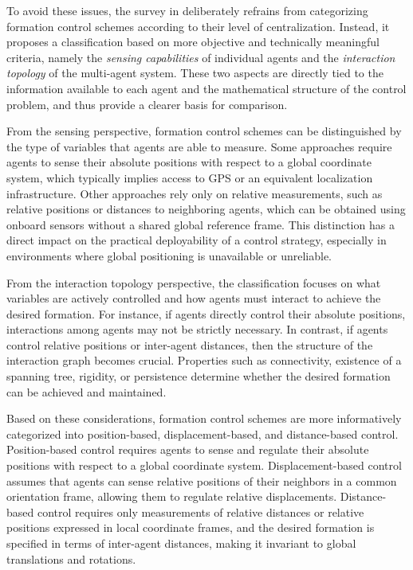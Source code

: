 To avoid these issues, the survey in \cite{Oh2015} deliberately refrains from categorizing formation control schemes according to their level of centralization. Instead, it proposes a classification based on more objective and technically meaningful criteria, namely the \emph{sensing capabilities} of individual agents and the \emph{interaction topology} of the multi-agent system. These two aspects are directly tied to the information available to each agent and the mathematical structure of the control problem, and thus provide a clearer basis for comparison.

From the sensing perspective, formation control schemes can be distinguished by the type of variables that agents are able to measure. Some approaches require agents to sense their absolute positions with respect to a global coordinate system, which typically implies access to GPS or an equivalent localization infrastructure. Other approaches rely only on relative measurements, such as relative positions or distances to neighboring agents, which can be obtained using onboard sensors without a shared global reference frame. This distinction has a direct impact on the practical deployability of a control strategy, especially in environments where global positioning is unavailable or unreliable.

From the interaction topology perspective, the classification focuses on what variables are actively controlled and how agents must interact to achieve the desired formation. For instance, if agents directly control their absolute positions, interactions among agents may not be strictly necessary. In contrast, if agents control relative positions or inter-agent distances, then the structure of the interaction graph becomes crucial. Properties such as connectivity, existence of a spanning tree, rigidity, or persistence determine whether the desired formation can be achieved and maintained.

Based on these considerations, formation control schemes are more informatively categorized into position-based, displacement-based, and distance-based control. Position-based control requires agents to sense and regulate their absolute positions with respect to a global coordinate system. Displacement-based control assumes that agents can sense relative positions of their neighbors in a common orientation frame, allowing them to regulate relative displacements. Distance-based control requires only measurements of relative distances or relative positions expressed in local coordinate frames, and the desired formation is specified in terms of inter-agent distances, making it invariant to global translations and rotations.

